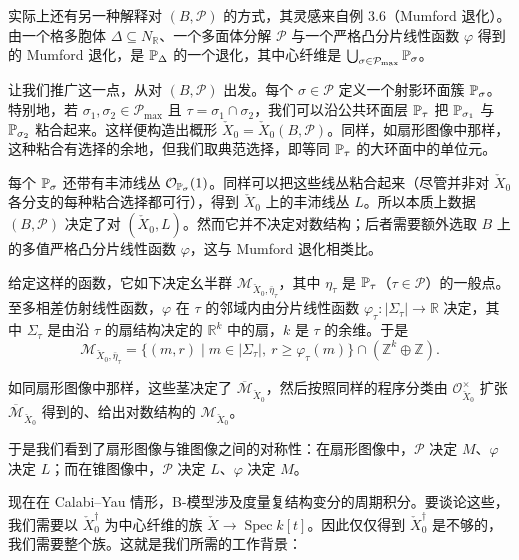 实际上还有另一种解释对 $(B,\mathcal{P})$ 的方式，其灵感来自例 3.6（Mumford 退化）。由一个格多胞体 $\Delta\subseteq N_{\mathbb{R}}$、一个多面体分解 $\mathcal{P}$ 与一个严格凸分片线性函数 $\varphi$ 得到的 Mumford 退化，是 $\mathbb{P}_{\Delta}$ 的一个退化，其中心纤维是 $\bigcup_{\sigma\in\mathcal{P}_{\max}}\mathbb{P}_{\sigma}$。

让我们推广这一点，从对 $(B,\mathcal{P})$ 出发。每个 $\sigma\in\mathcal{P}$ 定义一个射影环面簇 $\mathbb{P}_{\sigma}$。特别地，若 $\sigma_1,\sigma_2\in\mathcal{P}_{\max}$ 且 $\tau=\sigma_1\cap\sigma_2$，我们可以沿公共环面层 $\mathbb{P}_\tau$ 把 $\mathbb{P}_{\sigma_1}$ 与 $\mathbb{P}_{\sigma_2}$ 粘合起来。这样便构造出概形 $\check X_0=\check X_0(B,\mathcal{P})$。同样，如扇形图像中那样，这种粘合有选择的余地，但我们取典范选择，即等同 $\mathbb{P}_\tau$ 的大环面中的单位元。

每个 $\mathbb{P}_\sigma$ 还带有丰沛线丛 $\mathcal{O}_{\mathbb{P}_\sigma}(1)$。同样可以把这些线丛粘合起来（尽管并非对 $\check X_0$ 各分支的每种粘合选择都可行），得到 $\check X_0$ 上的丰沛线丛 $L$。所以本质上数据 $(B,\mathcal{P})$ 决定了对 $(\check X_0,L)$。然而它并不决定对数结构；后者需要额外选取 $B$ 上的多值严格凸分片线性函数 $\varphi$，这与 Mumford 退化相类比。

给定这样的函数，它如下决定幺半群 $\mathcal{M}_{\check X_0,\bar\eta_\tau}$，其中 $\eta_\tau$ 是 $\mathbb{P}_\tau$（$\tau\in\mathcal{P}$）的一般点。至多相差仿射线性函数，$\varphi$ 在 $\tau$ 的邻域内由分片线性函数 $\varphi_\tau:|\Sigma_\tau|\to\mathbb{R}$ 决定，其中 $\Sigma_\tau$ 是由沿 $\tau$ 的扇结构决定的 $\mathbb{R}^k$ 中的扇，$k$ 是 $\tau$ 的余维。于是
\begin{equation}
  \mathcal{M}_{\check X_0,\bar\eta_\tau}=\{(m,r)\mid m\in|\Sigma_\tau|,\ r\ge\varphi_\tau(m)\}\cap(\mathbb{Z}^k\oplus\mathbb{Z}). \tag{6.2}
\end{equation}

如同扇形图像中那样，这些茎决定了 $\overline{\mathcal{M}}_{\check X_0}$，然后按照同样的程序分类由 $\mathcal{O}_{\check X_0}^{\times}$ 扩张 $\overline{\mathcal{M}}_{\check X_0}$ 得到的、给出对数结构的 $\mathcal{M}_{\check X_0}$。

于是我们看到了扇形图像与锥图像之间的对称性：在扇形图像中，$\mathcal{P}$ 决定 $M$、$\varphi$ 决定 $L$；而在锥图像中，$\mathcal{P}$ 决定 $L$、$\varphi$ 决定 $M$。

现在在 Calabi–Yau 情形，B-模型涉及度量复结构变分的周期积分。要谈论这些，我们需要以 $\check X_0^{\dagger}$ 为中心纤维的族 $\check X\to\operatorname{Spec} k[t]$。因此仅仅得到 $\check X_0^{\dagger}$ 是不够的，我们需要整个族。这就是我们所需的工作背景：

